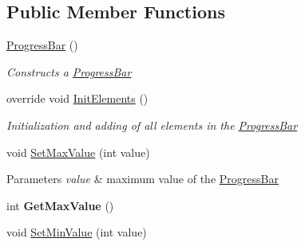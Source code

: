\subsection*{Public Member Functions}
\begin{DoxyCompactItemize}
\item 
\mbox{\hyperlink{class_space_v_i_l_1_1_progress_bar_afaaadcd993c494fd34bff6bd0385faa5}{Progress\+Bar}} ()
\begin{DoxyCompactList}\small\item\em Constructs a \mbox{\hyperlink{class_space_v_i_l_1_1_progress_bar}{Progress\+Bar}} \end{DoxyCompactList}\item 
override void \mbox{\hyperlink{class_space_v_i_l_1_1_progress_bar_a61f9a8602172eebf205ed6eee8cb3e30}{Init\+Elements}} ()
\begin{DoxyCompactList}\small\item\em Initialization and adding of all elements in the \mbox{\hyperlink{class_space_v_i_l_1_1_progress_bar}{Progress\+Bar}} \end{DoxyCompactList}\item 
\mbox{\label{class_space_v_i_l_1_1_progress_bar_a396a56495a97bcbe649bdb3d514893bc}} 
void \mbox{\hyperlink{class_space_v_i_l_1_1_progress_bar_a396a56495a97bcbe649bdb3d514893bc}{Set\+Max\+Value}} (int value)
\begin{DoxyCompactList}\small\item\em 
\begin{DoxyParams}{Parameters}
{\em value} & maximum value of the \mbox{\hyperlink{class_space_v_i_l_1_1_progress_bar}{Progress\+Bar}} \\
\hline
\end{DoxyParams}
\end{DoxyCompactList}\item 
\mbox{\label{class_space_v_i_l_1_1_progress_bar_af32d45ea6d44af6139d6709f7256653a}} 
int {\bfseries Get\+Max\+Value} ()
\item 
\mbox{\label{class_space_v_i_l_1_1_progress_bar_a9c3c5736106e1240eb2480d25c3b9a3d}} 
void \mbox{\hyperlink{class_space_v_i_l_1_1_progress_bar_a9c3c5736106e1240eb2480d25c3b9a3d}{Set\+Min\+Value}} (int value)
\begin{DoxyCompactList}\small\item\em 

\end{DoxyCompactList}
\end{DoxyCompactItemize}
